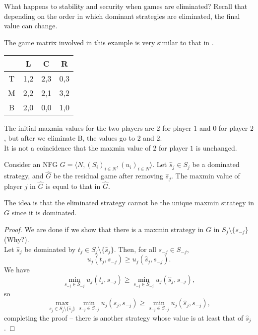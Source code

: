 	What happens to stability and security when games are eliminated? Recall that depending on the order in which dominant strategies are eliminated, the final value can change.

	\begin{fex}
		The game matrix involved in this example is very similar to that in .
		\begin{center}
		\begin{tabular}{|c||c|c|c|}
			\hline
			& \textsf{L} & \textsf{C} & \textsf{R} \\
			\hline\hline
			\textsf{T} & 1,2 & 2,3 & 0,3 \\
			\hline
			\textsf{M} & 2,2 & 2,1 & 3,2 \\
			\hline
			\textsf{B} & 2,0 & 0,0 & 1,0 \\ \hline
		\end{tabular}
		\end{center}
		The initial maxmin values for the two players are $2$ for player $1$ and $0$ for player $2$, but after we eliminate \textsf{B}, the values go to $2$ and $2$.\\
		It is not a coincidence that the maxmin value of $2$ for player $1$ is unchanged.
	\end{fex}

	\begin{ftheo}
		Consider an NFG $G = \langle N , (S_i)_{i \in N} , (u_i)_{i \in N}\rangle$. Let $\hat{s}_j \in S_j$ be a dominated strategy, and $\hat{G}$ be the residual game after removing $\hat{s}_j$. The maxmin value of player $j$ in $\hat{G}$ is equal to that in $\hat{G}$.
	\end{ftheo}

	The idea is that the eliminated strategy cannot be the unique maxmin strategy in $G$ since it is dominated.

	\begin{proof}
		We are done if we show that there is a maxmin strategy in $G$ in $S_{j} \setminus \{s_{-j}\}$ (Why?).\\
		Let $\hat{s}_j$ be dominated by $t_j \in S_j \setminus \{\hat{s}_j\}$. Then, for all $s_{-j} \in S_{-j}$,
		\[ u_j(t_j,s_{-j}) \ge u_j(\hat{s}_j,s_{-j}). \]
		We have
		\[ \min_{s_{-j} \in S_{-j}} u_j(t_j,s_{-j}) \ge \min_{s_{-j} \in S_{-j}} u_j(\hat{s}_j,s_{-j}), \]
		so
		\[ \max_{s_j \in S_{j} \setminus \{\hat{s}_j\}} \min_{s_{-j} \in S_{-j}} u_j(s_j,s_{-j}) \ge \min_{s_{-j} \in S_{-j}} u_j(\hat{s}_j,s_{-j}), \]
		completing the proof -- there is another strategy whose value is at least that of $\hat{s}_j$.
	\end{proof}

